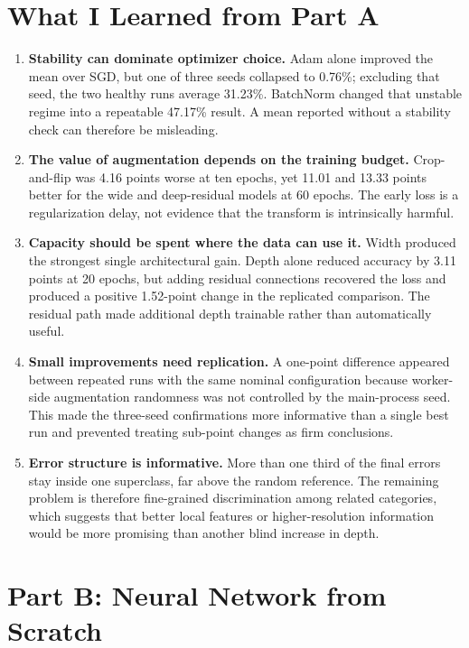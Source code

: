 \documentclass[10pt]{article}
\begin{document}
\section{What I Learned from Part A}

\begin{enumerate}
    \item \textbf{Stability can dominate optimizer choice.} Adam alone improved the mean over SGD, but one of three seeds collapsed to 0.76\%; excluding that seed, the two healthy runs average 31.23\%. BatchNorm changed that unstable regime into a repeatable 47.17\% result. A mean reported without a stability check can therefore be misleading.
    \item \textbf{The value of augmentation depends on the training budget.} Crop-and-flip was 4.16 points worse at ten epochs, yet 11.01 and 13.33 points better for the wide and deep-residual models at 60 epochs. The early loss is a regularization delay, not evidence that the transform is intrinsically harmful.
    \item \textbf{Capacity should be spent where the data can use it.} Width produced the strongest single architectural gain. Depth alone reduced accuracy by 3.11 points at 20 epochs, but adding residual connections recovered the loss and produced a positive 1.52-point change in the replicated comparison. The residual path made additional depth trainable rather than automatically useful.
    \item \textbf{Small improvements need replication.} A one-point difference appeared between repeated runs with the same nominal configuration because worker-side augmentation randomness was not controlled by the main-process seed. This made the three-seed confirmations more informative than a single best run and prevented treating sub-point changes as firm conclusions.
    \item \textbf{Error structure is informative.} More than one third of the final errors stay inside one superclass, far above the random reference. The remaining problem is therefore fine-grained discrimination among related categories, which suggests that better local features or higher-resolution information would be more promising than another blind increase in depth.
\end{enumerate}

\clearpage
\section*{Part B: Neural Network from Scratch}
\setcounter{section}{0}
\renewcommand{\thesection}{B.\arabic{section}}
\end{document}
